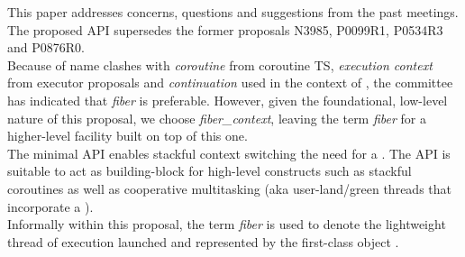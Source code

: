 
This paper addresses concerns, questions and suggestions from the past meetings.
The proposed API supersedes the former proposals N3985\cite{N3985},
P0099R1\cite{P0099R1}, P0534R3\cite{P0534R3} and P0876R0\cite{P0876R0}.\\
Because of name clashes with \emph{coroutine} from coroutine TS,
\emph{execution context} from executor proposals and \emph{continuation} used
in the context of , the committee has indicated
that \emph{fiber} is preferable. However, given the foundational, low-level
nature of this proposal, we choose \emph{fiber\_context}, leaving the
term \emph{fiber} for a higher-level facility built on top of this one.\\

The minimal API enables stackful context switching  the need for a
. The API is suitable to act as building-block for high-level
constructs such as stackful coroutines as well as cooperative multitasking
(aka user-land/green threads that incorporate a ).\\

Informally within this proposal, the term \emph{fiber} is used to denote the
lightweight thread of execution launched and represented by the first-class
object \fiber.
